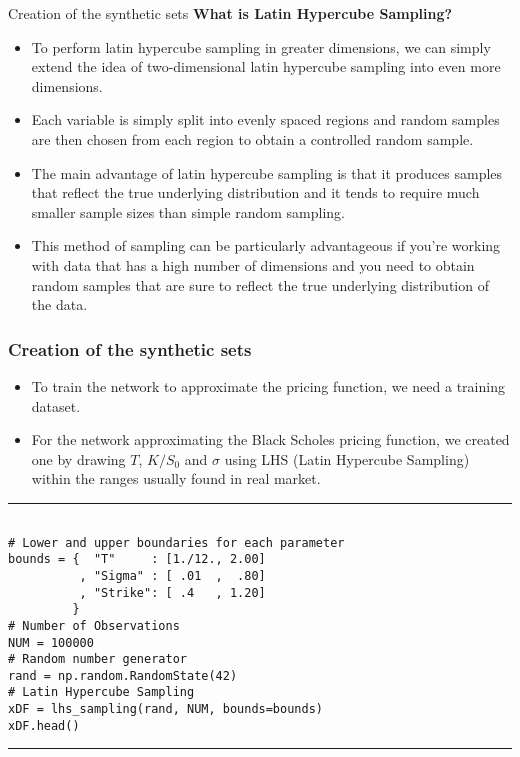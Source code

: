 \documentclass[11pt]{beamer}
\begin{document}
\begin{frame}{Creation of the synthetic sets}
\textbf{What is Latin Hypercube Sampling?}
\begin{itemize}
\item To perform latin hypercube sampling in greater dimensions, we can simply extend the idea of two-dimensional latin hypercube sampling into even more dimensions.

\item Each variable is simply split into evenly spaced regions and random samples are then chosen from each region to obtain a controlled random sample.

\item The main advantage of latin hypercube sampling is that it produces samples that reflect the true underlying distribution and it tends to require much smaller sample sizes than simple random sampling. 

\item This method of sampling can be particularly advantageous if you’re working with data that has a high number of dimensions and you need to obtain random samples that are sure to reflect the true underlying distribution of the data.
\end{itemize}
\end{frame}
\begin{frame}[fragile]
\frametitle{Creation of the synthetic sets}
\begin{itemize}
		\item To train the network to approximate the pricing function, we need a training
dataset. 
\item For the network approximating the Black Scholes pricing function,
we created one by drawing $T$, $K/S_0$ and $\sigma$ using LHS (Latin Hypercube Sampling) within the ranges
usually found in real market.
\end{itemize}
\rule{\textwidth}{1pt}
\scriptsize
\begin{verbatim}

# Lower and upper boundaries for each parameter
bounds = {  "T"     : [1./12., 2.00]
          , "Sigma" : [ .01  ,  .80]
          , "Strike": [ .4   , 1.20]
         }
# Number of Observations
NUM = 100000
# Random number generator
rand = np.random.RandomState(42)
# Latin Hypercube Sampling
xDF = lhs_sampling(rand, NUM, bounds=bounds)
xDF.head()

\end{verbatim}
\rule{\textwidth}{1pt}
\end{frame}
\end{document}
